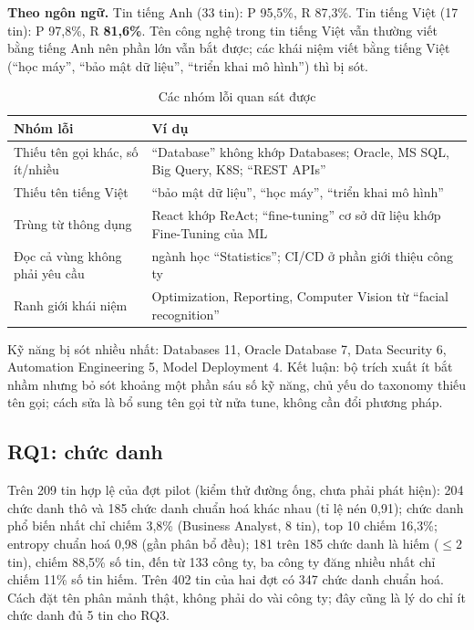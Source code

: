 \documentclass[12pt]{article}
\begin{document}
\textbf{Theo ngôn ngữ.} Tin tiếng Anh (33 tin): P 95,5\%, R 87,3\%. Tin tiếng Việt (17 tin): P 97,8\%, R \textbf{81,6\%}. Tên công nghệ trong tin tiếng Việt vẫn thường viết bằng tiếng Anh nên phần lớn vẫn bắt được; các khái niệm viết bằng tiếng Việt (``học máy'', ``bảo mật dữ liệu'', ``triển khai mô hình'') thì bị sót.

\begin{table}[htbp]
\centering
\caption{Các nhóm lỗi quan sát được}
\label{tab:parser-errors}
\renewcommand{\arraystretch}{1.15}
\begin{tabularx}{\textwidth}{>{\raggedright\arraybackslash}p{4.6cm} X}
\toprule
\textbf{Nhóm lỗi} & \textbf{Ví dụ} \\
\midrule
Thiếu tên gọi khác, số ít/nhiều & ``Database'' không khớp Databases; Oracle, MS SQL, Big Query, K8S; ``REST APIs'' \\
Thiếu tên tiếng Việt & ``bảo mật dữ liệu'', ``học máy'', ``triển khai mô hình'' \\
Trùng từ thông dụng & React khớp ReAct; ``fine-tuning'' cơ sở dữ liệu khớp Fine-Tuning của ML \\
Đọc cả vùng không phải yêu cầu & ngành học ``Statistics''; CI/CD ở phần giới thiệu công ty \\
Ranh giới khái niệm & Optimization, Reporting, Computer Vision từ ``facial recognition'' \\
\bottomrule
\end{tabularx}
\end{table}

Kỹ năng bị sót nhiều nhất: Databases 11, Oracle Database 7, Data Security 6, Automation Engineering 5, Model Deployment 4. Kết luận: bộ trích xuất ít bắt nhầm nhưng bỏ sót khoảng một phần sáu số kỹ năng, chủ yếu do taxonomy thiếu tên gọi; cách sửa là bổ sung tên gọi từ nửa tune, không cần đổi phương pháp.

\subsection{RQ1: chức danh}

Trên 209 tin hợp lệ của đợt pilot (kiểm thử đường ống, chưa phải phát hiện): 204 chức danh thô và 185 chức danh chuẩn hoá khác nhau (tỉ lệ nén 0,91); chức danh phổ biến nhất chỉ chiếm 3,8\% (Business Analyst, 8 tin), top 10 chiếm 16,3\%; entropy chuẩn hoá 0,98 (gần phân bổ đều); 181 trên 185 chức danh là hiếm ($\le 2$ tin), chiếm 88,5\% số tin, đến từ 133 công ty, ba công ty đăng nhiều nhất chỉ chiếm 11\% số tin hiếm. Trên 402 tin của hai đợt có 347 chức danh chuẩn hoá. Cách đặt tên phân mảnh thật, không phải do vài công ty; đây cũng là lý do chỉ ít chức danh đủ 5 tin cho RQ3.
\end{document}
